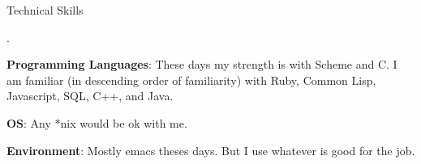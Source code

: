 \begin{rubric}{Technical Skills}{

  .

  
  \entry* \textbf{Programming Languages}: These days my strength is
  with Scheme and C. I am familiar (in descending order of
  familiarity) with Ruby, Common Lisp, Javascript, SQL, C++, and
  Java.
  
  \entry* \textbf{OS}: Any *nix would be ok with me.

  \entry* \textbf{Environment}: Mostly emacs theses days. But I use
  whatever is good for the job.
  
}\end{rubric}
